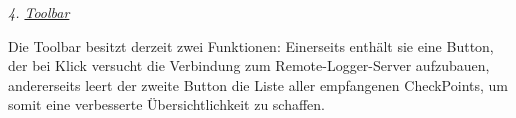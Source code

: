 \par \textit{4. \underline{Toolbar}} \vspace{-5px}
\par Die Toolbar besitzt derzeit zwei Funktionen: Einerseits enthält sie eine Button, der bei Klick versucht die Verbindung zum Remote-Logger-Server aufzubauen, andererseits leert der zweite Button die Liste aller empfangenen CheckPoints, um somit eine verbesserte Übersichtlichkeit zu schaffen.
